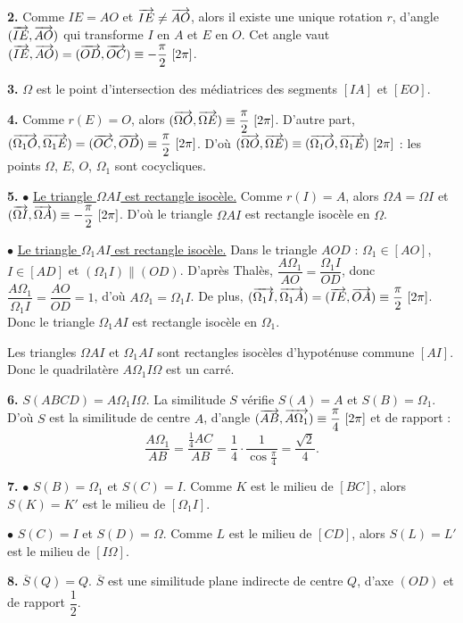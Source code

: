 \documentclass[11pt]{article}
\begin{document}
\textbf{2.} Comme $IE = AO$ et $\overrightarrow{IE} \ne \overrightarrow{AO}$, alors il existe une unique rotation $r$, d'angle $(\overrightarrow{IE}, \overrightarrow{AO})$ qui transforme $I$ en $A$ et $E$ en $O$. Cet angle vaut $(\overrightarrow{IE}, \overrightarrow{AO}) = (\overrightarrow{OD}, \overrightarrow{OC}) \equiv -\dfrac{\pi}{2}\ [2\pi]$.

\textbf{3.} $\Omega$ est le point d'intersection des médiatrices des segments $[IA]$ et $[EO]$.

\textbf{4.} Comme $r(E) = O$, alors $(\overrightarrow{\Omega O}, \overrightarrow{\Omega E}) \equiv \dfrac{\pi}{2}\ [2\pi]$. D'autre part, $(\overrightarrow{\Omega_1 O}, \overrightarrow{\Omega_1 E}) = (\overrightarrow{OC}, \overrightarrow{OD}) \equiv \dfrac{\pi}{2}\ [2\pi]$. D'où $(\overrightarrow{\Omega O}, \overrightarrow{\Omega E}) \equiv (\overrightarrow{\Omega_1 O}, \overrightarrow{\Omega_1 E})\ [2\pi]$ : les points $\Omega$, $E$, $O$, $\Omega_1$ sont cocycliques.

\textbf{5.} $\bullet$ \underline{Le triangle $\Omega AI$ est rectangle isocèle.} Comme $r(I) = A$, alors $\Omega A = \Omega I$ et $(\overrightarrow{\Omega I}, \overrightarrow{\Omega A}) \equiv -\dfrac{\pi}{2}\ [2\pi]$. D'où le triangle $\Omega AI$ est rectangle isocèle en $\Omega$.

$\bullet$ \underline{Le triangle $\Omega_1 AI$ est rectangle isocèle.} Dans le triangle $AOD$ : $\Omega_1 \in [AO]$, $I \in [AD]$ et $(\Omega_1 I) \parallel (OD)$. D'après Thalès, $\dfrac{A\Omega_1}{AO} = \dfrac{\Omega_1 I}{OD}$, donc $\dfrac{A\Omega_1}{\Omega_1 I} = \dfrac{AO}{OD} = 1$, d'où $A\Omega_1 = \Omega_1 I$. De plus, $(\overrightarrow{\Omega_1 I}, \overrightarrow{\Omega_1 A}) = (\overrightarrow{IE}, \overrightarrow{OA}) \equiv \dfrac{\pi}{2}\ [2\pi]$. Donc le triangle $\Omega_1 AI$ est rectangle isocèle en $\Omega_1$.

Les triangles $\Omega AI$ et $\Omega_1 AI$ sont rectangles isocèles d'hypoténuse commune $[AI]$. Donc le quadrilatère $A\Omega_1 I\Omega$ est un carré.

\textbf{6.} $S(ABCD) = A\Omega_1 I\Omega$. La similitude $S$ vérifie $S(A) = A$ et $S(B) = \Omega_1$. D'où $S$ est la similitude de centre $A$, d'angle $(\overrightarrow{AB}, \overrightarrow{A\Omega_1}) \equiv \dfrac{\pi}{4}\ [2\pi]$ et de rapport :
\[ \frac{A\Omega_1}{AB} = \frac{\frac{1}{4}AC}{AB} = \frac{1}{4} \cdot \frac{1}{\cos\frac{\pi}{4}} = \frac{\sqrt{2}}{4}. \]

\textbf{7.} $\bullet$ $S(B) = \Omega_1$ et $S(C) = I$. Comme $K$ est le milieu de $[BC]$, alors $S(K) = K'$ est le milieu de $[\Omega_1 I]$.

$\bullet$ $S(C) = I$ et $S(D) = \Omega$. Comme $L$ est le milieu de $[CD]$, alors $S(L) = L'$ est le milieu de $[I\Omega]$.

\textbf{8.} $\overline{S}(Q) = Q$. $\overline{S}$ est une similitude plane indirecte de centre $Q$, d'axe $(OD)$ et de rapport $\dfrac{1}{2}$.
\end{document}
